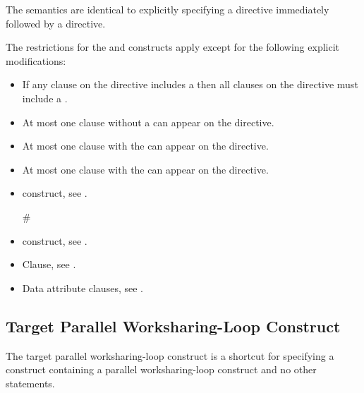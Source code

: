 \descr
The semantics are identical to explicitly specifying a  directive
immediately followed by a  directive.

\restrictions

The restrictions for the  and  constructs apply except for the following explicit modifications:

\begin{itemize}
\item If any  clause on the directive includes a
       then all  clauses
      on the directive must include a .

\item At most one  clause without a
       can appear on the directive.

\item At most one  clause with the 
       can appear on the directive.


\item At most one  clause with the 
       can appear on the directive.
\end{itemize}

\crossreferences
\begin{itemize}
\item {} construct, see
.

#\item {} construct, see
.

\item {} Clause, see .

\item Data attribute clauses, see
.
\end{itemize}










\subsection{Target Parallel Worksharing-Loop Construct}
\label{subsec:Target Parallel Worksharing-Loop Construct}
\summary
The target parallel worksharing-loop construct is a shortcut for specifying a 
construct containing a parallel worksharing-loop construct and no other statements.

